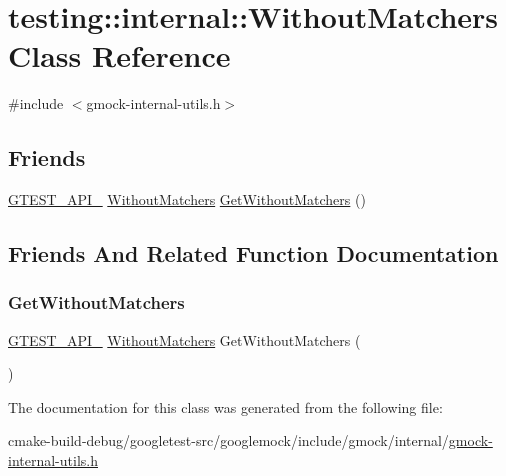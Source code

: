 \hypertarget{classtesting_1_1internal_1_1WithoutMatchers}{}\section{testing\+::internal\+::Without\+Matchers Class Reference}
\label{classtesting_1_1internal_1_1WithoutMatchers}


{\ttfamily \#include $<$gmock-\/internal-\/utils.\+h$>$}

\subsection*{Friends}
\begin{DoxyCompactItemize}
\item 
\mbox{\hyperlink{gtest-port_8h_aa73be6f0ba4a7456180a94904ce17790}{G\+T\+E\+S\+T\+\_\+\+A\+P\+I\+\_\+}} \mbox{\hyperlink{classtesting_1_1internal_1_1WithoutMatchers}{Without\+Matchers}} \mbox{\hyperlink{classtesting_1_1internal_1_1WithoutMatchers_aec6c0de08b3c9096e2365c023664a848}{Get\+Without\+Matchers}} ()
\end{DoxyCompactItemize}


\subsection{Friends And Related Function Documentation}
\mbox{\label{classtesting_1_1internal_1_1WithoutMatchers_aec6c0de08b3c9096e2365c023664a848}} 
\subsubsection{\texorpdfstring{GetWithoutMatchers}{GetWithoutMatchers}}
{\footnotesize\ttfamily \mbox{\hyperlink{gtest-port_8h_aa73be6f0ba4a7456180a94904ce17790}{G\+T\+E\+S\+T\+\_\+\+A\+P\+I\+\_\+}} \mbox{\hyperlink{classtesting_1_1internal_1_1WithoutMatchers}{Without\+Matchers}} Get\+Without\+Matchers (\begin{DoxyParamCaption}{ }\end{DoxyParamCaption})\hspace{0.3cm}{\ttfamily [friend]}}



The documentation for this class was generated from the following file\+:\begin{DoxyCompactItemize}
\item 
cmake-\/build-\/debug/googletest-\/src/googlemock/include/gmock/internal/\mbox{\hyperlink{gmock-internal-utils_8h}{gmock-\/internal-\/utils.\+h}}\end{DoxyCompactItemize}
